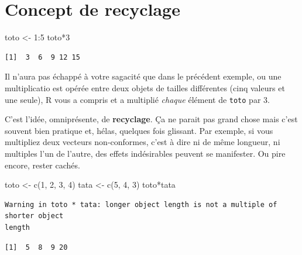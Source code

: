 \documentclass[
  letterpaper,
  DIV=11,
  numbers=noendperiod]{scrreprt}
\newenvironment{Shaded}{\begin{snugshade}}{\end{snugshade}}
\newcommand{\DecValTok}[1]{\textcolor[rgb]{0.68,0.00,0.00}{#1}}
\newcommand{\FunctionTok}[1]{\textcolor[rgb]{0.28,0.35,0.67}{#1}}
\newcommand{\NormalTok}[1]{\textcolor[rgb]{0.00,0.23,0.31}{#1}}
\newcommand{\OtherTok}[1]{\textcolor[rgb]{0.00,0.23,0.31}{#1}}
\newcommand{\SpecialCharTok}[1]{\textcolor[rgb]{0.37,0.37,0.37}{#1}}
\begin{document}
\hypertarget{concept-de-recyclage}{%
\section{Concept de recyclage}\label{concept-de-recyclage}}

\begin{Shaded}
\begin{Highlighting}[]
\NormalTok{toto }\OtherTok{\textless{}{-}} \DecValTok{1}\SpecialCharTok{:}\DecValTok{5}
\NormalTok{toto}\SpecialCharTok{*}\DecValTok{3}
\end{Highlighting}
\end{Shaded}

\begin{verbatim}
[1]  3  6  9 12 15
\end{verbatim}

Il n'aura pas échappé à votre sagacité que dans le précédent exemple, ou
une multiplicatio est opérée entre deux objets de tailles différentes
(cinq valeurs et une seule), R vous a compris et a multiplié
\emph{chaque} élément de \texttt{toto} par 3.

C'est l'idée, omniprésente, de \textbf{recyclage}. Ça ne parait pas
grand chose mais c'est souvent bien pratique et, hélas, quelques fois
glissant. Par exemple, si vous multipliez deux vecteurs non-conformes,
c'est à dire ni de même longueur, ni multiples l'un de l'autre, des
effets indésirables peuvent se manifester. Ou pire encore, rester
cachés.

\begin{Shaded}
\begin{Highlighting}[]
\NormalTok{toto }\OtherTok{\textless{}{-}} \FunctionTok{c}\NormalTok{(}\DecValTok{1}\NormalTok{, }\DecValTok{2}\NormalTok{, }\DecValTok{3}\NormalTok{, }\DecValTok{4}\NormalTok{)}
\NormalTok{tata }\OtherTok{\textless{}{-}} \FunctionTok{c}\NormalTok{(}\DecValTok{5}\NormalTok{, }\DecValTok{4}\NormalTok{, }\DecValTok{3}\NormalTok{)}
\NormalTok{toto}\SpecialCharTok{*}\NormalTok{tata}
\end{Highlighting}
\end{Shaded}

\begin{verbatim}
Warning in toto * tata: longer object length is not a multiple of shorter object
length
\end{verbatim}

\begin{verbatim}
[1]  5  8  9 20
\end{verbatim}
\end{document}
